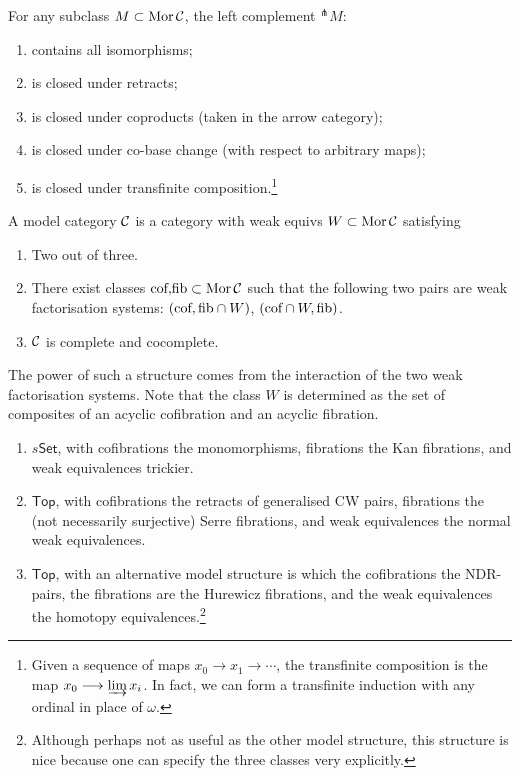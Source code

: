 \documentclass[11pt]{article}
\begin{document}
\begin{JeremyModelCategories}
\begin{defn*}
\end{defn*}
\begin{prop*}
For any subclass $M\subset\Mor\calC$, the left complement ${^\pitchfork M}$:
\begin{enumerate}\squishlist
\item contains all isomorphisms;
\item is closed under retracts;
\item is closed under coproducts (taken in the arrow category);
\item is closed under co-base change (with respect to arbitrary maps);
\item is closed under transfinite composition.\footnote{Given a sequence of maps $x_0\to x_1\to\cdots$, the transfinite composition is the map $x_0\to\varinjlim x_i$. In fact, we can form a transfinite induction with any ordinal in place of $\omega$.}
\end{enumerate}
\end{prop*}
\begin{defn*}
A model category $\calC$ is a category with weak equivs $W\subset\Mor\calC$ satisfying
\begin{enumerate}\squishlist
\item Two out of three.
\item There exist classes $\textup{cof,fib}\subset\Mor\calC$ such that the following two pairs are weak factorisation systems: $(\textup{cof},\textup{fib}\cap W)$, $(\textup{cof}\cap W,\textup{fib})$.
\item $\calC$ is complete and cocomplete.
\end{enumerate}
\noindent The power of such a structure comes from the interaction of the two weak factorisation systems. Note that the class $W$ is determined as the set of composites of an acyclic cofibration and an acyclic fibration.
\begin{exmps*}
\begin{enumerate}\squishlist
\item $s\mathsf{Set}$, with cofibrations the monomorphisms, fibrations the Kan fibrations, and weak equivalences trickier.
\item $\mathsf{Top}$, with cofibrations the retracts of generalised CW pairs, fibrations the (not necessarily surjective) Serre fibrations, and weak equivalences the normal weak equivalences.
\item $\mathsf{Top}$, with an alternative model structure is which the cofibrations the NDR-pairs, the fibrations are the Hurewicz fibrations, and the weak equivalences the homotopy equivalences.\footnote{Although perhaps not as useful as the other model structure, this structure is nice because one can specify the three classes very explicitly.}
\end{enumerate}


\end{exmps*}
\end{defn*}
\end{JeremyModelCategories}
\end{document}
